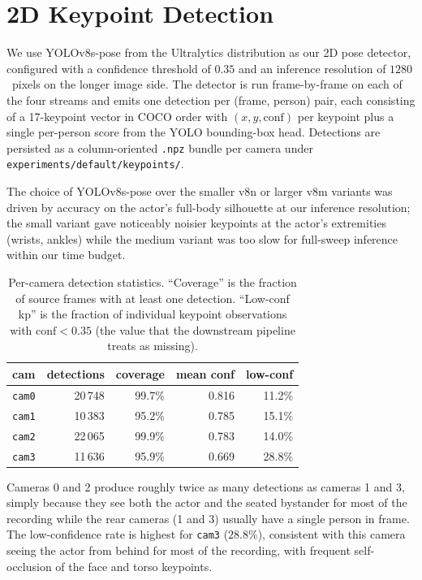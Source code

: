 \documentclass[twocolumn]{article}
\newcommand{\cam}[1]{\texttt{cam#1}}
\begin{document}
\section{2D Keypoint Detection}
\label{sec:keypoints}

We use YOLOv8s-pose from the Ultralytics distribution as our 2D pose
detector, configured with a confidence threshold of $0.35$ and an
inference resolution of $1280$~pixels on the longer image side. The
detector is run frame-by-frame on each of the four streams and emits
one detection per (frame, person) pair, each consisting of a
17-keypoint vector in COCO order with $(x, y, \text{conf})$ per
keypoint plus a single per-person score from the YOLO bounding-box
head. Detections are persisted as a column-oriented \texttt{.npz}
bundle per camera under \texttt{experiments/default/keypoints/}.

The choice of YOLOv8s-pose over the smaller v8n or larger v8m
variants was driven by accuracy on the actor's full-body silhouette
at our inference resolution; the small variant gave noticeably
noisier keypoints at the actor's extremities (wrists, ankles) while
the medium variant was too slow for full-sweep inference within our
time budget.

\begin{table}[tbp]
\centering\small
\caption{Per-camera detection statistics. ``Coverage'' is the
fraction of source frames with at least one detection. ``Low-conf
kp'' is the fraction of individual keypoint observations with
$\text{conf} < 0.35$ (the value that the downstream pipeline treats
as missing).}
\label{tab:yolo-stats}
\begin{tabular}{|c|r|r|r|r|}
\hline
cam & detections & coverage & mean conf & low-conf \\
\hline
\cam{0} & 20\,748 & 99.7\% & 0.816 & 11.2\% \\
\cam{1} & 10\,383 & 95.2\% & 0.785 & 15.1\% \\
\cam{2} & 22\,065 & 99.9\% & 0.783 & 14.0\% \\
\cam{3} & 11\,636 & 95.9\% & 0.669 & 28.8\% \\
\hline
\end{tabular}
\end{table}

Cameras 0 and 2 produce roughly twice as many detections as cameras
1 and 3, simply because they see both the actor and the seated
bystander for most of the recording while the rear cameras (1 and 3)
usually have a single person in frame. The low-confidence rate is
highest for \cam{3} ($28.8\%$), consistent with this camera seeing the
actor from behind for most of the recording, with frequent
self-occlusion of the face and torso keypoints.
\end{document}
